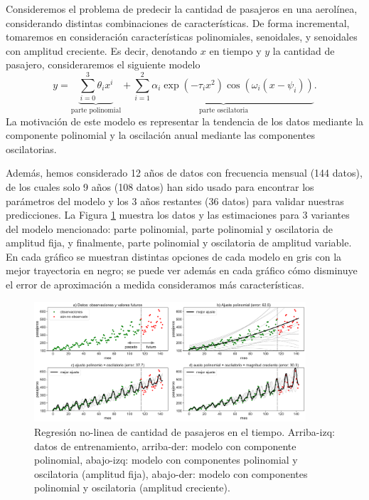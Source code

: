 \fi


\begin{mdframed}[style=ejemplo, frametitle={\center Ejemplo: Predicción de pasajeros de una aerolínea)}]

Consideremos el problema de predecir la cantidad de pasajeros en una aerolínea, considerando  distintas combinaciones de características. De forma incremental, tomaremos en consideración características polinomiales,  senoidales, y senoidales con amplitud creciente. Es decir, denotando $x$ en tiempo y $y$  la cantidad de pasajero, consideraremos el siguiente modelo
\begin{equation}
    y = \underbrace{\sum_{i=0}^3 \theta_i x^i}_\text{parte polinomial} + \underbrace{ \sum_{i=1}^2 \alpha_i\exp(-\tau_ix^2)\cos(\omega_i(x-\psi_i))}_\text{parte oscilatoria}.
\end{equation}
La motivación de este modelo es representar la tendencia de los datos mediante la componente polinomial y la oscilación anual mediante las componentes oscilatorias.

Además, hemos considerado 12 años de datos con frecuencia mensual (144 datos), de los cuales solo 9 años (108 datos) han sido usado para encontrar los parámetros del modelo y los  3 años restantes (36 datos) para validar nuestras predicciones. La Figura \ref{fig:pasajeros} muestra los datos y las estimaciones para 3 variantes del modelo mencionado: parte polinomial, parte polinomial y oscilatoria de amplitud fija, y finalmente,  parte polinomial y oscilatoria de amplitud variable. En cada gráfico se muestran distintas opciones de cada  modelo en gris con la mejor  trayectoria en negro; se puede ver además en cada gráfico cómo disminuye el error de aproximación a medida consideramos más características. 


\begin{figure}[H]
    \centering
    \includegraphics[width=0.9\textwidth, frame]{img/cap1_pasajeros.pdf}
    \caption{Regresión no-linea de cantidad de pasajeros en el tiempo. Arriba-izq: datos de entrenamiento, arriba-der: modelo con componente polinomial, abajo-izq: modelo con componentes polinomial y oscilatoria (amplitud fija), abajo-der: modelo con componentes polinomial y oscilatoria (amplitud creciente).}
    \label{fig:pasajeros}  
\end{figure}
\end{mdframed}




